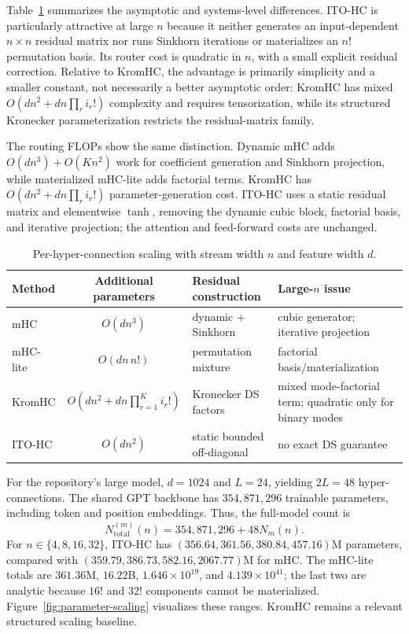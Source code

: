 \documentclass{article}
\begin{document}
Table~\ref{tab:scaling} summarizes the asymptotic and systems-level differences. ITO-HC is particularly attractive at large $n$ because it neither generates an input-dependent $n\times n$ residual matrix nor runs Sinkhorn iterations or materializes an $n!$ permutation basis. Its router cost is quadratic in $n$, with a small explicit residual correction. Relative to KromHC, the advantage is primarily simplicity and a smaller constant, not necessarily a better asymptotic order: KromHC has mixed $O(dn^2+dn\prod_r i_r!)$ complexity and requires tensorization, while its structured Kronecker parameterization restricts the residual-matrix family.

The routing FLOPs show the same distinction. Dynamic mHC adds $O(dn^3)+O(Kn^2)$ work for coefficient generation and Sinkhorn projection, while materialized mHC-lite adds factorial terms. KromHC has $O(dn^2+dn\prod_r i_r!)$ parameter-generation cost. ITO-HC uses a static residual matrix and elementwise $\tanh$, removing the dynamic cubic block, factorial basis, and iterative projection; the attention and feed-forward costs are unchanged.

\begin{table}[t]
\caption{Per-hyper-connection scaling with stream width $n$ and feature width $d$.}
\label{tab:scaling}
\begin{center}
\small
\begin{tabularx}{\linewidth}{@{}l c X X@{}}
\toprule
Method & Additional parameters & Residual construction & Large-$n$ issue\\
\midrule
mHC & $O(dn^3)$ & dynamic + Sinkhorn & cubic generator; iterative projection\\
mHC-lite & $O(dn\,n!)$ & permutation mixture & factorial basis/materialization\\
KromHC & $O\!\left(dn^2+dn\prod_{r=1}^{K}i_r!\right)$ & Kronecker DS factors & mixed mode-factorial term; quadratic only for binary modes\\
ITO-HC & $O(dn^2)$ & static bounded off-diagonal & no exact DS guarantee\\
\bottomrule
\end{tabularx}
\end{center}
\end{table}

For the repository's large model, $d=1024$ and $L=24$, yielding $2L=48$ hyper-connections. The shared GPT backbone has $354{,}871{,}296$ trainable parameters, including token and position embeddings. Thus, the full-model count is
\begin{equation}
 N_{\mathrm{total}}^{(m)}(n)=354{,}871{,}296+48N_m(n).
 \label{eq:large-total-params}
\end{equation}
For $n\in\{4,8,16,32\}$, ITO-HC has $(356.64,361.56,380.84,457.16)$M parameters, compared with $(359.79,386.73,582.16,2067.77)$M for mHC. The mHC-lite totals are $361.36$M, $16.22$B, $1.646\times10^{19}$, and $4.139\times10^{41}$; the last two are analytic because $16!$ and $32!$ components cannot be materialized. Figure~\ref{fig:parameter-scaling} visualizes these ranges. KromHC remains a relevant structured scaling baseline.
\end{document}
